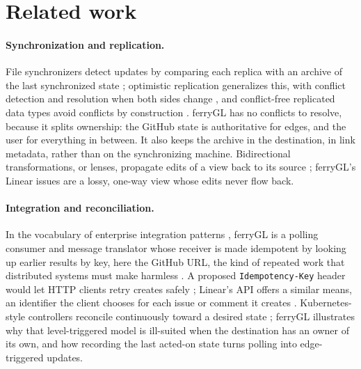 \documentclass[11pt,a4paper]{article}
\newcommand{\ferry}{ferryGL}
\newcommand{\code}[1]{\texttt{#1}}
\begin{document}
\section{Related work}
\label{sec:related}

\paragraph{Synchronization and replication.} File synchronizers detect updates by comparing each
replica with an archive of the last synchronized state \cite{balasubramaniam1998file,
pierce2004unison}; optimistic replication generalizes this, with conflict detection and
resolution when both sides change \cite{saito2005optimistic, terry1995managing}, and
conflict-free replicated data types avoid conflicts by construction \cite{shapiro2011conflict}.
\ferry{} has no conflicts to resolve, because it splits ownership: the GitHub state is
authoritative for edges, and the user for everything in between. It also keeps the archive in
the destination, in link metadata, rather than on the synchronizing machine. Bidirectional
transformations, or lenses, propagate edits of a view back to its source
\cite{foster2007combinators}; \ferry's Linear issues are a lossy, one-way view whose edits never
flow back.

\paragraph{Integration and reconciliation.} In the vocabulary of enterprise integration patterns
\cite{hohpe2003enterprise}, \ferry{} is a polling consumer and message translator whose receiver
is made idempotent by looking up earlier results by key, here the GitHub URL, the kind of
repeated work that distributed systems must make harmless \cite{helland2012idempotence}. A
proposed \code{Idempotency-Key} header would let HTTP clients retry creates safely
\cite{jena2025idempotency}; Linear's API offers a similar means, an identifier the client
chooses for each issue or comment it creates \cite{linear2026schema}. Kubernetes-style
controllers reconcile continuously toward a desired state \cite{burns2016borg}; \ferry{} illustrates
why that level-triggered model is ill-suited when the destination has an owner of its own, and how
recording the last acted-on state turns polling into edge-triggered updates.
\end{document}
